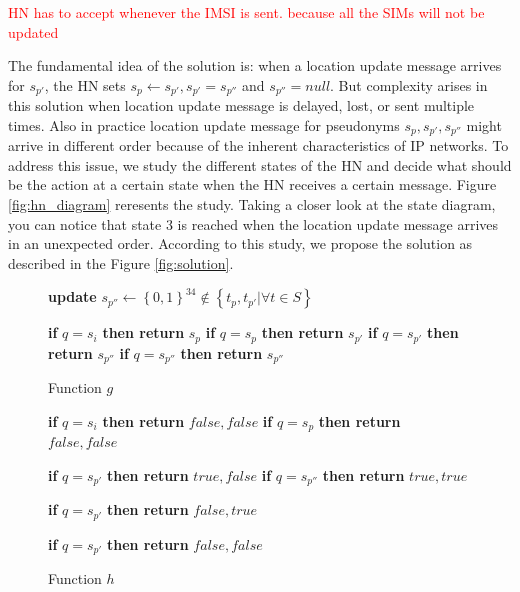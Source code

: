\documentclass{llncs} %
\begin{document}
\textcolor{red}{HN has to accept whenever the IMSI is sent. because all the SIMs will not be updated}

The fundamental idea of the solution is: when a location update message arrives for $s_{p'}$, the HN sets $s_p \leftarrow s_{p'}, s_{p'} = s_{p''}$ and $s_{p''} = null$. But complexity arises in this solution when location update message is delayed,  lost, or sent multiple times. Also in practice location update message for pseudonyms $s_{p},s_{p'},s_{p''}$ might arrive in different order because of the inherent characteristics of IP networks. To address this issue, we study the different states of  the HN and decide what should be the action at a certain state when the HN receives a certain message. Figure \ref{fig:hn_diagram} reresents the study. Taking a closer look at the state diagram, you can notice that state $3$ is reached when the location update message arrives in an unexpected order. According to this study, we propose the solution as described in the  Figure \ref{fig:solution}.


\begin{figure}[!tbp]
  \centering
  \begin{minipage}[b]{0.44\textwidth}
    \begin{algorithmic}

    			\State \textbf{update} $ s_{p''} \leftarrow \left\lbrace 0,1\right\rbrace^{34} \notin  \left\lbrace t_p,t_{p'}\vert \forall t \in S \right\rbrace$    	
			\EndIf
	
		\State \textbf{if} {$q = s_{i}$} \textbf{then return} $s_{p}$
    	\State \textbf{if} {$q = s_{p}$} \textbf{then return} $s_{p'}$ 
  	  	\State \textbf{if} {$q = s_{p'}$} \textbf{then return} $s_{p''}$ 
    	\State \textbf{if} {$q = s_{p''}$} \textbf{then return} $s_{p''}$ 
		\EndFunction
	 \caption{Function $g$}
	 \label{func:g}
	\end{algorithmic}
  \end{minipage}
  \hfill
  \begin{minipage}[b]{0.55\textwidth}
    \begin{algorithmic}

			\State \textbf{if} $q = s_{i}$ \textbf{then return } $false, false$ 
			\State \textbf{if} $q = s_{p}$ \textbf{then return } $false, false$ 

    			\State \textbf{if} $q = s_{p'}$ \textbf{then return } $true, false$ 
    			\State \textbf{if} {$q = s_{p''}$} \textbf{then return} $true, true$
			\EndIf

    			\State \textbf{if} $q = s_{p'}$ \textbf{then return } $false, true$ 
			\EndIf
	
    			\State \textbf{if} $q = s_{p'}$ \textbf{then return } $false, false$ 
			\EndIf
		
		\EndFunction
	\caption{Function $h$}
	\label{func:h}
	\end{algorithmic}
  \end{minipage}
\end{figure}
\end{document}
